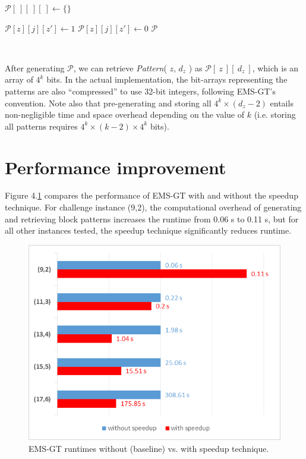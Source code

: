 \documentclass[oneside,12pt]{DISCSthesis}
\begin{document}
{{\begin{algorithmic}[1]
					\State $\mathcal{P}[\ ][\ ][\ ] \leftarrow \{\}$ \hspace*{90pt}

						\State $\mathcal{P}[z][j][z'] \leftarrow 1$
					\Else
						\State $\mathcal{P}[z][j][z'] \leftarrow 0$
					\EndIf\EndFor\EndFor\EndFor
					\State\Return $\mathcal{P}$
					\end{algorithmic}
				}\normalsize{}\
			
		After generating $\mathcal{P}$, we can retrieve {\em Pattern}( $z$, $d_z$ ) as $\mathcal{P}[\ z\ ][\ d_z\ ]$, which is an array of $4^k$ bits. In the actual implementation, the bit-arrays representing the patterns are also ``compressed'' to use 32-bit integers, following EMS-GT's convention. Note also that pre-generating and storing all $4^k \times (d_z - 2)$ entails non-negligible time and space overhead depending on the value of $k$ (i.e. storing all patterns requires $4^k \times (k-2) \times 4^k$ bits).
		\newpage

	\section{Performance improvement}
		Figure 4.\ref{fig:results1} compares the performance of EMS-GT with and without the speedup technique. For challenge instance (9,2), the computational overhead of generating and retrieving block patterns increases the runtime from 0.06 s to 0.11 s, but for all other instances tested, the speedup technique significantly reduces runtime.

		\begin{figure}[ht]\label{fig:results1}
			\centering
			\includegraphics[width=5.0in]{img/emsgt-without-vs-with-speedup}
			\caption{EMS-GT runtimes without (baseline) vs. with speedup technique.}
			\end{figure}

}
\end{document}
